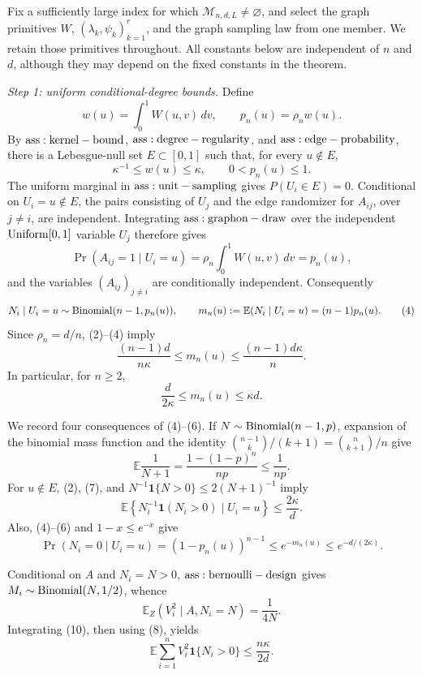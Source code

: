 Fix a sufficiently large index for which \(\mathcal M_{n,d,L}\neq\varnothing\), and select the graph primitives \(W\), \((\lambda_k,\psi_k)_{k=1}^r\), and the graph sampling law from one member.  We retain those primitives throughout.  All constants below are independent of \(n\) and \(d\), although they may depend on the fixed constants in the theorem.

\textit{Step 1: uniform conditional-degree bounds.}
Define
\[
 w(u)=\int_0^1W(u,v)\,dv,
 \qquad
 p_n(u)=\rho_nw(u).
\tag{1}
\]
By \({\rm ass:kernel-bound}\), \({\rm ass:degree-regularity}\), and \({\rm ass:edge-probability}\), there is a Lebesgue-null set \(E\subset[0,1]\) such that, for every \(u\notin E\),
\[
 \kappa^{-1}\leq w(u)\leq\kappa,
 \qquad 0<p_n(u)\leq1.
\tag{2}
\]
The uniform marginal in \({\rm ass:unit-sampling}\) gives \(P(U_i\in E)=0\).  Conditional on \(U_i=u\notin E\), the pairs consisting of \(U_j\) and the edge randomizer for \(A_{ij}\), over \(j\neq i\), are independent.  Integrating \({\rm ass:graphon-draw}\) over the independent \({\rm Uniform}[0,1]\) variable \(U_j\) therefore gives
\[
 \Pr(A_{ij}=1\mid U_i=u)
 =\rho_n\int_0^1W(u,v)\,dv=p_n(u),
\tag{3}
\]
and the variables \((A_{ij})_{j\neq i}\) are conditionally independent.  Consequently
\[
 N_i\mid U_i=u\sim{\rm Binomial}(n-1,p_n(u)),
 \qquad
 m_n(u):=\mathbb E(N_i\mid U_i=u)=(n-1)p_n(u).
\tag{4}
\]
Since \(\rho_n=d/n\), (2)--(4) imply
\[
 \frac{(n-1)d}{n\kappa}\leq m_n(u)
 \leq\frac{(n-1)d\kappa}{n}.
\tag{5}
\]
In particular, for \(n\geq2\),
\[
 \frac{d}{2\kappa}\leq m_n(u)\leq\kappa d.
\tag{6}
\]

We record four consequences of (4)--(6).  If \(N\sim{\rm Binomial}(n-1,p)\), expansion of the binomial mass function and the identity \({n-1\choose k}/(k+1)={n\choose k+1}/n\) give
\[
 \mathbb E\frac1{N+1}
 =\frac{1-(1-p)^n}{np}\leq\frac1{np}.
\tag{7}
\]
For \(u\notin E\), (2), (7), and \(N^{-1}\mathbf1\{N>0\}\leq2(N+1)^{-1}\) imply
\[
 \mathbb E\left\{N_i^{-1}\mathbf1(N_i>0)\mid U_i=u\right\}
 \leq\frac{2\kappa}{d}.
\tag{8}
\]
Also, (4)--(6) and \(1-x\leq e^{-x}\) give
\[
 \Pr(N_i=0\mid U_i=u)=(1-p_n(u))^{n-1}
 \leq e^{-m_n(u)}\leq e^{-d/(2\kappa)}.
\tag{9}
\]

Conditional on \(A\) and \(N_i=N>0\), \({\rm ass:bernoulli-design}\) gives \(M_i\sim{\rm Binomial}(N,1/2)\), whence
\[
 \mathbb E_Z(V_i^2\mid A,N_i=N)=\frac1{4N}.
\tag{10}
\]
Integrating (10), then using (8), yields
\[
 \mathbb E\sum_{i=1}^nV_i^2\mathbf1\{N_i>0\}
 \leq\frac{n\kappa}{2d}.
\tag{11}
\]

